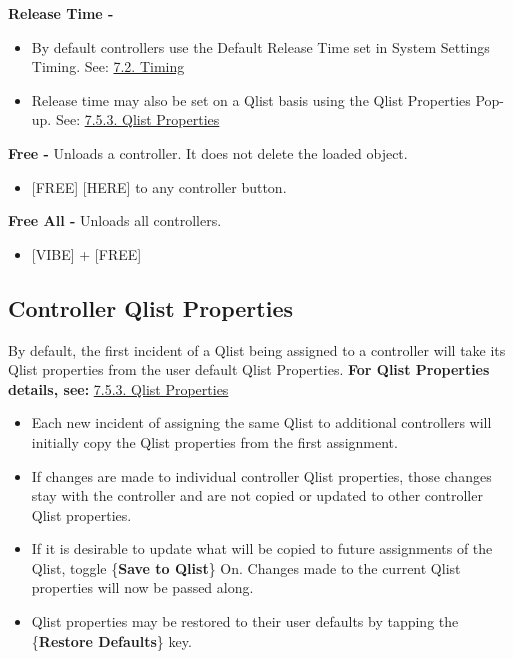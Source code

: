\documentclass[
]{article}
\providecommand{\tightlist}{%
  \setlength{\itemsep}{0pt}\setlength{\parskip}{0pt}}
\begin{document}
\textbf{Release Time -}

\begin{itemize}
\item
  By default controllers use the Default Release Time set in System Settings Timing. See: \href{https://vibemanual.compulite.com/system-default-settings.html\#timing}{7.2. Timing}
\item
  Release time may also be set on a Qlist basis using the Qlist Properties Pop-up. See: \href{https://vibemanual.compulite.com/system-default-settings.html\#qlist-properties}{7.5.3. Qlist Properties}
\end{itemize}

\textbf{Free -} Unloads a controller. It does not delete the loaded object.

\begin{itemize}
\tightlist
\item
  {[}FREE{]} {[}HERE{]} to any controller button.
\end{itemize}

\textbf{Free All -} Unloads all controllers.

\begin{itemize}
\tightlist
\item
  {[}VIBE{]} + {[}FREE{]}
\end{itemize}

\hypertarget{controller-qlist-properties}{%
\subsection{Controller Qlist Properties}\label{controller-qlist-properties}}

By default, the first incident of a Qlist being assigned to a controller will take its Qlist properties from the user default Qlist Properties.
\textbf{For Qlist Properties details, see:} \href{https://vibemanual.compulite.com/system-default-settings.html\#qlist-properties}{7.5.3. Qlist Properties}

\begin{itemize}
\item
  Each new incident of assigning the same Qlist to additional controllers will initially copy the Qlist properties from the first assignment.
\item
  If changes are made to individual controller Qlist properties, those changes stay with the controller and are not copied or updated to other controller Qlist properties.
\item
  If it is desirable to update what will be copied to future assignments of the Qlist, toggle \{\textbf{Save to Qlist}\} On. Changes made to the current Qlist properties will now be passed along.
\item
  Qlist properties may be restored to their user defaults by tapping the \{\textbf{Restore Defaults}\} key.
\end{itemize}
\end{document}
